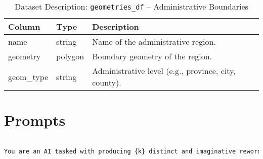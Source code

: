 \begin{table}[H]
\centering
\caption{Dataset Description: \texttt{geometries\_df} – Administrative Boundaries}
\begin{tabular}{|l|l|p{8cm}|}
\hline
\textbf{Column} & \textbf{Type} & \textbf{Description} \\
\hline
name & string & Name of the administrative region. \\
geometry & polygon & Boundary geometry of the region. \\
geom\_type & string & Administrative level (e.g., province, city, county). \\
\hline
\end{tabular}
\end{table}



\section{Prompts}
\label{appendix:prompts}


\begin{lstlisting}[language=txt, caption={Prompt for generating Python code solutions}, label={lst:prompt_code_generation}, basicstyle=\ttfamily\small, breaklines=true, columns=fullflexible, keepspaces=true]

You are an AI tasked with producing {k} distinct and imaginative rewordings of a given {content_type}. Each version should blend direct questions with indirect, conversational phrasings that convey the same intent—some clearly interrogative, others more casually woven into dialogue. Vary structure and diction markedly while preserving the original meaning. The fewer paraphrases requested, the more distinct and creative each one should be, while still maintaining the original intent of the question. Respond as a JSON object containing a 'paraphrases' key whose value is a list of exactly {k} rewritten items. Re‑order arguments when necessary, since the prompts are template‑generated. Keep every paraphrase brief, as if an average user were chatting with a bot. Any terms wrapped in <> must remain unchanged. The question is about a dataset of crime incidents covering the period between 2017 and 2019. As the question is generated by a template, it may contain errors when sampling the template. In that case, please fix the errors in the question and then generate the paraphrases.
\end{lstlisting}